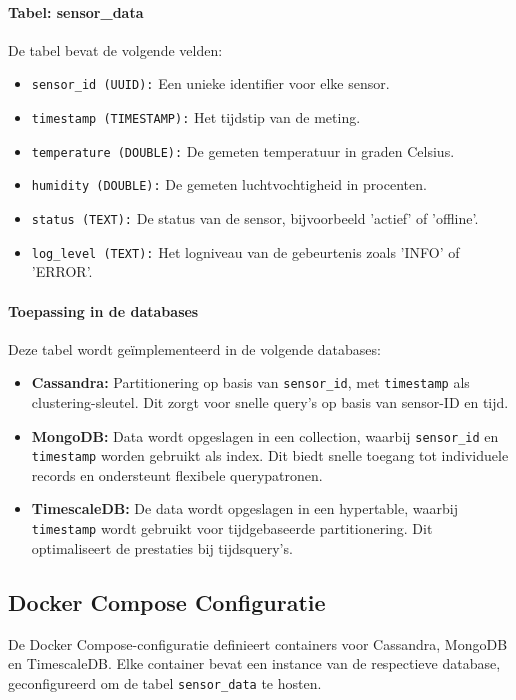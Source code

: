 \paragraph{Tabel: sensor\_data}
De tabel bevat de volgende velden:
\begin{itemize}
	\item \texttt{sensor\_id (UUID):} Een unieke identifier voor elke sensor.
	\item \texttt{timestamp (TIMESTAMP):} Het tijdstip van de meting.
	\item \texttt{temperature (DOUBLE):} De gemeten temperatuur in graden Celsius.
	\item \texttt{humidity (DOUBLE):} De gemeten luchtvochtigheid in procenten.
	\item \texttt{status (TEXT):} De status van de sensor, bijvoorbeeld 'actief' of 'offline'.
	\item \texttt{log\_level (TEXT):} Het logniveau van de gebeurtenis zoals 'INFO' of 'ERROR'.
\end{itemize}

\paragraph{Toepassing in de databases}
Deze tabel wordt geïmplementeerd in de volgende databases:
\begin{itemize}
	\item \textbf{Cassandra:} Partitionering op basis van \texttt{sensor\_id}, met \texttt{timestamp} als clustering-sleutel. Dit zorgt voor snelle query's op basis van sensor-ID en tijd.
	\item \textbf{MongoDB:} Data wordt opgeslagen in een collection, waarbij \texttt{sensor\_id} en \texttt{timestamp} worden gebruikt als index. Dit biedt snelle toegang tot individuele records en ondersteunt flexibele querypatronen.
	\item \textbf{TimescaleDB:} De data wordt opgeslagen in een hypertable, waarbij \texttt{timestamp} wordt gebruikt voor tijdgebaseerde partitionering. Dit optimaliseert de prestaties bij tijdsquery's.
\end{itemize}

\subsection{Docker Compose Configuratie}
De Docker Compose-configuratie definieert containers voor Cassandra, MongoDB en TimescaleDB. Elke container bevat een instance van de respectieve database, geconfigureerd om de tabel \texttt{sensor\_data} te hosten.

